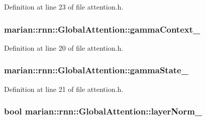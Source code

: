 Definition at line 23 of file attention.\+h.

\subsubsection[{\texorpdfstring{gamma\+Context\+\_\+}{gammaContext_}}]{ marian\+::rnn\+::\+Global\+Attention\+::gamma\+Context\+\_\+\hspace{0.3cm}{\ttfamily [private]}}\hypertarget{classmarian_1_1rnn_1_1GlobalAttention_a6616011b10e275bb43ca2a66a9817d7e}{}\label{classmarian_1_1rnn_1_1GlobalAttention_a6616011b10e275bb43ca2a66a9817d7e}


Definition at line 20 of file attention.\+h.

\subsubsection[{\texorpdfstring{gamma\+State\+\_\+}{gammaState_}}]{ marian\+::rnn\+::\+Global\+Attention\+::gamma\+State\+\_\+\hspace{0.3cm}{\ttfamily [private]}}\hypertarget{classmarian_1_1rnn_1_1GlobalAttention_aa934fc65efbfb2b16427f02c135ccb69}{}\label{classmarian_1_1rnn_1_1GlobalAttention_aa934fc65efbfb2b16427f02c135ccb69}


Definition at line 21 of file attention.\+h.

\subsubsection[{\texorpdfstring{layer\+Norm\+\_\+}{layerNorm_}}]{\setlength{\rightskip}{0pt plus 5cm}bool marian\+::rnn\+::\+Global\+Attention\+::layer\+Norm\+\_\+\hspace{0.3cm}{\ttfamily [private]}}\hypertarget{classmarian_1_1rnn_1_1GlobalAttention_a30abb68765a3b8d6a1b88f471b9f3c6b}{}\label{classmarian_1_1rnn_1_1GlobalAttention_a30abb68765a3b8d6a1b88f471b9f3c6b}


